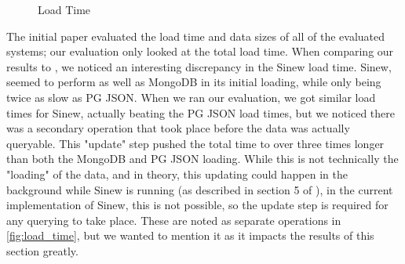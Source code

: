\documentclass[sigconf]{acmart}
\begin{document}
\begin{figure}[!t]
\centering
{}
\caption{Load Time}
\label{fig:load_time}
\end{figure}

The initial paper evaluated the load time and data sizes of all of the evaluated systems; our evaluation only looked at the total load time. When comparing our results to \cite{Tahara_Diamond_Abadi_2014}, we noticed an interesting discrepancy in the Sinew load time. Sinew, seemed to perform as well as MongoDB in its initial loading, while only being twice as slow as PG JSON. When we ran our evaluation, we got similar load times for Sinew, actually beating the PG JSON load times, but we noticed there was a secondary operation that took place before the data was actually queryable. This "update" step pushed the total time to over three times longer than both the MongoDB and PG JSON loading. While this is not technically the "loading" of the data, and in theory, this updating could happen in the background while Sinew is running (as described in section 5 of \cite{Tahara_Diamond_Abadi_2014}), in the current implementation of Sinew, this is not possible, so the update step is required for any querying to take place. These are noted as separate operations in \autoref{fig:load_time}, but we wanted to mention it as it impacts the results of this section greatly.
\end{document}
